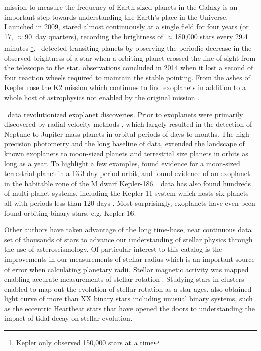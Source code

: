 
 mission to measure the frequency of Earth-sized planets in the Galaxy is an important step towards understanding the Earth's place in the Universe.  Launched in 2009, \Kepler{} stared almost continuously at a single field for four years (or 17, $\approx$90~day quarters), recording the brightness of $\approx$180,000 stars every 29.4 minutes \footnote{Kepler only observed 150,000 stars at a time}. \Kepler\ detected transiting planets by observing the periodic decrease in the observed brightness of a star when a orbiting planet crossed the line of sight from the telescope to the star.  observations concluded in 2014 when it lost a second of four reaction wheels required to maintain the stable pointing.  From the ashes of Kepler rose the K2 mission which continues to find exoplanets in addition to a whole host of astrophysics not enabled by the original \Kepler{} mission \citep{Howell2014}.


\Kepler\ data revolutionized exoplanet discoveries. Prior to \Kepler{,} exoplanets were primarily discovered by radial velocity methods \citep[e.g.][]{Queloz95}, which largely resulted in the detection of Neptune to Jupiter mass planets in orbital periods of days to months. The high precision photometry and the long baseline of \Kepler{} data, extended the landscape of known exoplanets to moon-sized planets and terrestrial size planets in orbits as long as a year. To highlight a few examples, \citep{Barclay2013} found evidence for a moon-sized terrestrial planet in a 13.3 day period orbit, and \citep{Quintana2014} found evidence of an exoplanet in the habitable zone of the M dwarf Kepler-186. \Kepler\ data has also found hundreds of multi-planet systems, including the Kepler-11 system which hosts six planets all with periods less than 120 days \citep{Lissauer2011}. Most surprisingly, exoplanets have even been found orbiting binary stars, e.g. Kepler-16\citep{Doyle2011}.

Other authors have taken advantage of the long time-base, near continuous data set of thousands of stars to advance our understanding of stellar physics through the use of asteroseismology. Of particular interest to this catalog is the improvements in our measurements of stellar radius \citep[e.g.][]{Mathur2017} which is an important source of error when calculating planetary radii. Stellar magnetic activity was mapped enabling accurate measurements of stellar rotation \citep[e.g.][]{Aigrain2015}. Studying stars in clusters enabled \citet{Meibom2011} to map out the evolution of stellar rotation as a star ages. \Kepler{} also obtained light curve of more than XX binary stars \citep{Prsa2011,Kirk2016} including unusual binary systems, such as the eccentric Heartbeat stars \citet{Welsh2011,Thompson2012} that have opened the doors to understanding the impact of tidal decay on stellar evolution.

